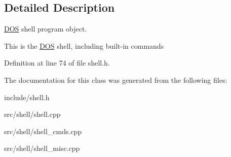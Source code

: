\subsection{Detailed Description}
\hyperlink{classDOS}{D\-O\-S} shell program object. 

This is the \hyperlink{classDOS}{D\-O\-S} shell, including built-\/in commands 

Definition at line 74 of file shell.\-h.



The documentation for this class was generated from the following files\-:\begin{DoxyCompactItemize}
\item 
include/shell.\-h\item 
src/shell/shell.\-cpp\item 
src/shell/shell\-\_\-cmds.\-cpp\item 
src/shell/shell\-\_\-misc.\-cpp\end{DoxyCompactItemize}
